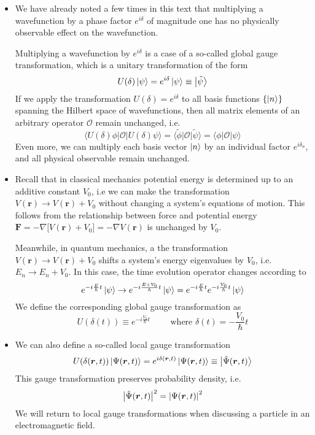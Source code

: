 \documentclass[11pt, a4paper]{article}
\renewcommand{\grad}{\nabla}
\renewcommand{\vec}[1]{\bm{#1}}  %
\renewcommand{\t}[1]{\tilde{#1}}
\renewcommand{\r}{\vec{r}}  %
\renewcommand{\O}{\mathcal{O}}  %
\newcommand{\p}{\psi}  %
\renewcommand{\P}{\Psi}  %
\newcommand{\bket}[1]{\big | {#1} \big \rangle }
\newcommand{\bmel}[3]{\big \langle {#1} \big | {#2} \big | {#3} \big \rangle}  %
\renewcommand{\k}[1]{\ket{#1}}
\begin{document}
\begin{itemize}
	\item We have already noted a few times in this text that multiplying a wavefunction by a phase factor $ e^{i\delta} $ of magnitude one has no physically observable effect on the wavefunction. 
	
	Multiplying a wavefunction by $ e^{i\delta} $ is a case of a so-called global gauge transformation, which is a unitary transformation of the form
	\begin{equation*}
		U(\delta)\ket{\psi} = e^{i\delta}\ket{\p} \equiv \bket{\tilde{\p}}
	\end{equation*}
	If we apply the transformation $ U(\delta) = e^{i\delta} $ to all basis functions $ \{\ket{n}\} $ spanning the Hilbert space of wavefunctions, then all matrix elements of an arbitrary operator $ \O $ remain unchanged, i.e. 
	\begin{equation*}
		\bmel{U(\delta) \phi}{\O}{U(\delta)\p} = \bmel{\t{\phi}}{\O}{\t{\p}} = \bmel{\phi}{\O}{\p} 
	\end{equation*}
	Even more, we can multiply each basis vector $ \ket{n} $ by an individual factor $ e^{i \delta_{n}} $, and all physical observable remain unchanged.
	
	\item Recall that in classical mechanics potential energy is determined up to an additive constant $ V_{0} $, i.e we can make the transformation $ V(\r) \to V(\r) + V_{0} $ without changing a system's equations of motion. This follows from the relationship between force and potential energy $ \vec{F} = - \grad\big[V(\r) + V_{0}\big] = - \grad V(\r) $ is unchanged by $ V_{0} $.
	
	Meanwhile, in quantum mechanics, a the transformation $ V(\r) \to V(\r) + V_{0} $ shifts a system's energy eigenvalues by $ V_{0} $, i.e. $ E_{n} \to E_{n} + V_{0} $. In this case, the time evolution operator changes according to
	\begin{equation*}
		e^{-i\frac{E}{\hbar}t}\k{\p} \to e^{-i\frac{E+V_{0}}{\hbar}t}\k{\p} = e^{-i\frac{E}{\hbar}t} e^{-i\frac{V_{0}}{\hbar}t}  \k{\p} 
	\end{equation*}
	We define the corresponding global gauge transformation as
	\begin{equation*}
		U(\delta(t)) \equiv e^{-i\frac{V_{0}}{\hbar}t} \qquad \text{ where } \delta(t) = -\frac{V_{0}}{\hbar}t
	\end{equation*}
	
	\item We can also define a so-called local gauge transformation
	\begin{equation*}
		U(\delta(\r, t)) \ket{\P(\r, t)} = e^{i\delta(\r, t)}\ket{\P(\r, t)} \equiv \bket{\t{\P}(\r, t)}
	\end{equation*}
	This gauge transformation preserves probability density, i.e.
	\begin{equation*}
		\big|\t{\P}(\r, t) \big|^{2} = \abs{\P(\r, t)}^{2}
	\end{equation*}
	We will return to local gauge transformations when discussing a particle in an electromagnetic field. 
\end{itemize}
\end{document}
